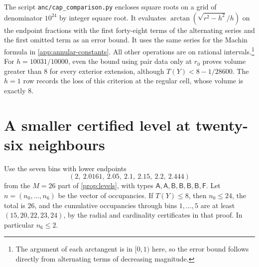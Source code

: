 The script \texttt{anc/cap\_comparison.py} encloses square
roots on a grid of denominator \(10^{24}\) by integer square
root. It evaluates \(\arctan(\sqrt{r^2-h^2}/h)\) on the
endpoint fractions with the first forty-eight terms of the
alternating series and the first omitted term as an error
bound. It uses the same series for the Machin formula in
\cref{app:annular-constants}. All other operations are on
rational intervals.\footnote{The argument of each arctangent
is in \([0,1)\) here, so the error bound follows directly
from alternating terms of decreasing magnitude.}
For \(h=10031/10000\), even the bound using pair data only
at \(r_0\) proves volume greater than \(8\) for every
exterior extension, although \(T(Y)<8-1/28600\).
The \(h=1\) row records the loss of this criterion at the
regular cell, whose volume is exactly \(8\).

\section{A smaller certified level at twenty-six neighbours}
\label{app:profiles-26}

Use the seven bins with lower endpoints
\[
 (2,\ 2.0161,\ 2.05,\ 2.1,\ 2.15,\ 2.2,\ 2.444)
\]
from the \(M=26\) part of \cref{prop:levels}, with types
\(\mathsf{A,A,B,B,B,B,F}\). Let \(n=(n_0,\ldots,n_6)\)
be the vector of occupancies. If \(T(Y)\le8\), then
\(n_0\le24\), the total is \(26\), and the cumulative
occupancies through bins \(1,\ldots,5\) are at least
\((15,20,22,23,24)\), by the radial and cardinality
certificates in that proof. In particular \(n_6\le2\).

